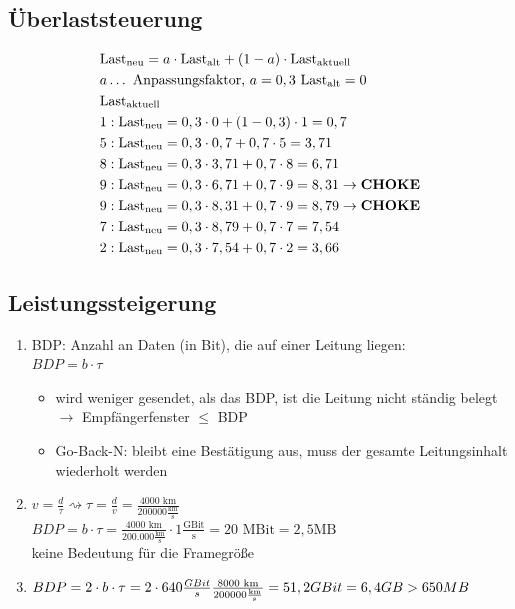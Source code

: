 \subsection{Überlaststeuerung}
\begin{align*}
	&\text{Last}_\text{neu} = a \cdot \text{Last}_\text{alt} + (1-a)\cdot \text{Last}_\text{aktuell} \\ &a \ldots \text{ Anpassungsfaktor, } a = 0,3 \text{ Last}_\text{alt} = 0\\
	&\text{Last}_\text{aktuell}\\
	&1: \text{Last}_\text{neu} = 0,3 \cdot 0 + (1-0,3) \cdot 1 = 0,7\\
	&5: \text{Last}_\text{neu} = 0,3 \cdot 0,7 + 0,7 \cdot 5 = 3,71\\
	&8: \text{Last}_\text{neu} = 0,3 \cdot 3,71 + 0,7 \cdot 8 = 6,71\\
	&9: \text{Last}_\text{neu} = 0,3 \cdot 6,71 + 0,7 \cdot 9 = 8,31 \to \text{\textbf{CHOKE}}\\
	&9: \text{Last}_\text{neu} = 0,3  \cdot 8,31 + 0,7 \cdot 9 = 8,79 \to \text{\textbf{CHOKE}}\\
	&7: \text{Last}_\text{neu} = 0,3  \cdot 8,79 + 0,7 \cdot 7 = 7,54 \\
	&2: \text{Last}_\text{neu} = 0,3  \cdot 7,54 + 0,7 \cdot 2 = 3,66 \\
\end{align*}
\subsection{Leistungssteigerung}
\begin{enumerate}
	\item BDP: Anzahl an Daten (in Bit), die auf einer Leitung liegen: \\$BDP = b \cdot \tau$ 
	\begin{itemize}
		\item wird weniger gesendet, als das BDP, ist die Leitung nicht ständig belegt $\to$ Empfängerfenster $\le$ BDP
		\item Go-Back-N: bleibt eine Bestätigung aus, muss der gesamte Leitungsinhalt wiederholt werden
	\end{itemize}
	\item $v = \frac{d}{\tau} \rightsquigarrow \tau = \frac{d}{v} = \frac{4000 \text{ km}}{200000 \frac{\text{km}}{\text{s}}}$\\$BDP = b \cdot \tau =  \frac{4000 \text{ km}}{200.000 \frac{\text{km}}{\text{s}}}\cdot 1\frac{\text{GBit}}{\text{s}} = 20\text{ MBit} = 2,5 \text{MB}$  \\keine Bedeutung für die Framegröße
	\item $BDP = 2 \cdot b \cdot \tau = 2 \cdot 640\frac{GBit}{s} \frac{8000 \text{ km}}{200000 \frac{\text{km}}{\text{s}}}\\ = 51,2 GBit = 6,4 GB > 650 MB$
\end{enumerate}
